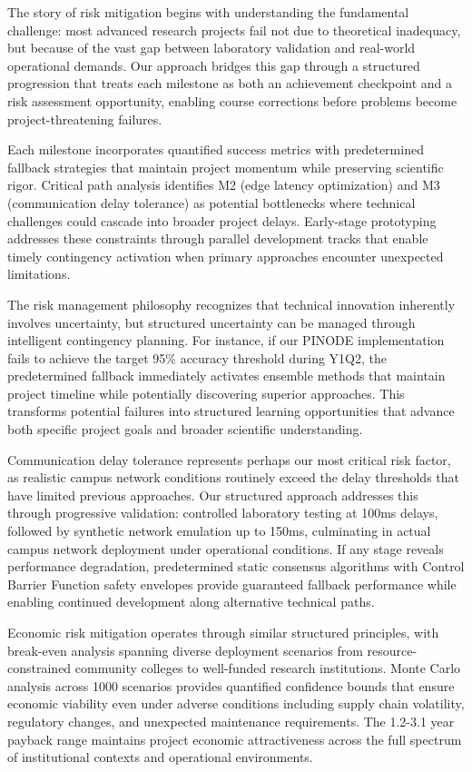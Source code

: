 \documentclass[12pt]{article}
\begin{document}
The story of risk mitigation begins with understanding the fundamental challenge: most advanced research projects fail not due to theoretical inadequacy, but because of the vast gap between laboratory validation and real-world operational demands. Our approach bridges this gap through a structured progression that treats each milestone as both an achievement checkpoint and a risk assessment opportunity, enabling course corrections before problems become project-threatening failures.

Each milestone incorporates quantified success metrics with predetermined fallback strategies that maintain project momentum while preserving scientific rigor. Critical path analysis identifies M2 (edge latency optimization) and M3 (communication delay tolerance) as potential bottlenecks where technical challenges could cascade into broader project delays. Early-stage prototyping addresses these constraints through parallel development tracks that enable timely contingency activation when primary approaches encounter unexpected limitations.

The risk management philosophy recognizes that technical innovation inherently involves uncertainty, but structured uncertainty can be managed through intelligent contingency planning. For instance, if our PINODE implementation fails to achieve the target 95\% accuracy threshold during Y1Q2, the predetermined fallback immediately activates ensemble methods that maintain project timeline while potentially discovering superior approaches. This transforms potential failures into structured learning opportunities that advance both specific project goals and broader scientific understanding.

Communication delay tolerance represents perhaps our most critical risk factor, as realistic campus network conditions routinely exceed the delay thresholds that have limited previous approaches. Our structured approach addresses this through progressive validation: controlled laboratory testing at 100ms delays, followed by synthetic network emulation up to 150ms, culminating in actual campus network deployment under operational conditions. If any stage reveals performance degradation, predetermined static consensus algorithms with Control Barrier Function safety envelopes provide guaranteed fallback performance while enabling continued development along alternative technical paths.

Economic risk mitigation operates through similar structured principles, with break-even analysis spanning diverse deployment scenarios from resource-constrained community colleges to well-funded research institutions. Monte Carlo analysis across 1000 scenarios provides quantified confidence bounds that ensure economic viability even under adverse conditions including supply chain volatility, regulatory changes, and unexpected maintenance requirements. The 1.2-3.1 year payback range maintains project economic attractiveness across the full spectrum of institutional contexts and operational environments.
\end{document}
